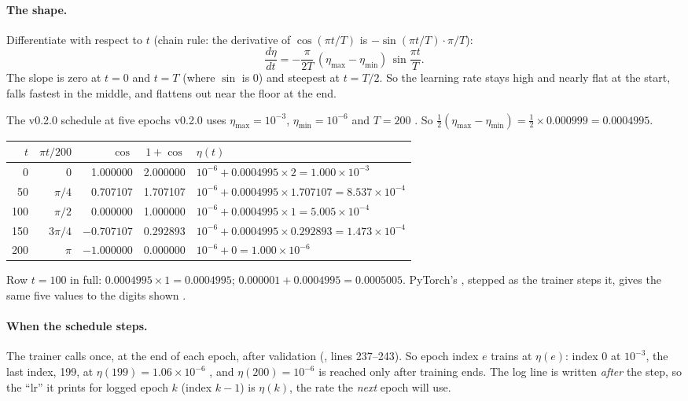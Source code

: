 \paragraph{The shape.} Differentiate with respect to $t$ (chain rule: the derivative of
$\cos(\pi t/T)$ is $-\sin(\pi t/T)\cdot\pi/T$):
\[
\frac{d\eta}{dt} = -\frac{\pi}{2T}\,(\eta_{\max} - \eta_{\min})\,\sin\frac{\pi t}{T}.
\]
The slope is zero at $t = 0$ and $t = T$ (where $\sin$ is 0) and steepest at $t = T/2$. So the
learning rate stays high and nearly flat at the start, falls fastest in the middle, and
flattens out near the floor at the end.

\begin{worked}[label={we:trainloop:cosine}]{The v0.2.0 schedule at five epochs}
v0.2.0 uses $\eta_{\max} = 10^{-3}$, $\eta_{\min} = 10^{-6}$ and $T = 200$
. So $\frac12(\eta_{\max} - \eta_{\min}) =
\frac12 \times 0.000999 = 0.0004995$.
\begin{center}
\begin{tabular}{rrrrl}
\toprule
$t$ & $\pi t/200$ & $\cos$ & $1 + \cos$ & $\eta(t)$\\
\midrule
0 & 0 & 1.000000 & 2.000000 & $10^{-6} + 0.0004995 \times 2 = 1.000 \times 10^{-3}$\\
50 & $\pi/4$ & 0.707107 & 1.707107 & $10^{-6} + 0.0004995 \times 1.707107 = 8.537 \times 10^{-4}$\\
100 & $\pi/2$ & 0.000000 & 1.000000 & $10^{-6} + 0.0004995 \times 1 = 5.005 \times 10^{-4}$\\
150 & $3\pi/4$ & $-0.707107$ & 0.292893 & $10^{-6} + 0.0004995 \times 0.292893 = 1.473 \times 10^{-4}$\\
200 & $\pi$ & $-1.000000$ & 0.000000 & $10^{-6} + 0 = 1.000 \times 10^{-6}$\\
\bottomrule
\end{tabular}
\end{center}
Row $t = 100$ in full: $0.0004995 \times 1 = 0.0004995$; $0.000001 + 0.0004995 = 0.0005005$.
PyTorch's , stepped as the trainer steps it, gives the same five values
to the digits shown \tagC.
\end{worked}

\paragraph{When the schedule steps.} The trainer calls  once, at the
end of each epoch, after validation (, lines
237--243). So epoch index $e$ trains at $\eta(e)$: index 0 at $10^{-3}$, the last index, 199, at
$\eta(199) = 1.06 \times 10^{-6}$ \tagC, and $\eta(200) = 10^{-6}$ is reached only after training
ends. The log line is written \emph{after} the step, so the ``lr'' it prints for logged epoch
$k$ (index $k - 1$) is $\eta(k)$, the rate the \emph{next} epoch will use.

